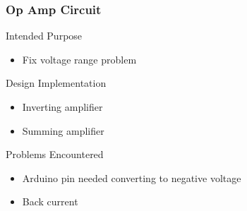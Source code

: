 \documentclass{beamer}
\begin{document}
\begin{frame}
	\frametitle{Op Amp Circuit}
		\begin{block}{Intended Purpose}
			\begin{itemize}
				\item Fix voltage range problem
			\end{itemize}
		\end{block}
		\begin{block}{Design Implementation}
			\begin{itemize}
				\item Inverting amplifier
				\item Summing amplifier
			\end{itemize}
		\end{block}
		\begin{block}{Problems Encountered}
			\begin{itemize}
				\item Arduino pin needed converting to negative voltage
				\item Back current
			\end{itemize}
		\end{block}		
\end{frame}
\end{document}
